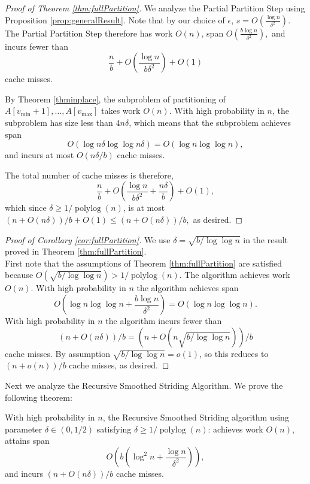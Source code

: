 \documentclass[twoside,leqno,twocolumn]{article}
\newcommand{\polylog}{\operatorname{polylog}}
\begin{document}
\begin{proof}[Proof of Theorem \ref{thm:fullPartition}]
  We analyze the Partial Partition Step using Proposition
  \ref{prop:generalResult}. Note that by our choice of $\epsilon$,
  $s=O\left(\frac{\log n}{\delta^2}\right)$.  The Partial Partition
  Step therefore has work $O(n)$, span $O\left(\frac{b\log
  n}{\delta^2}\right),$ and incurs fewer than
  $$\frac{n}{b}+O\left(\frac{\log n}{b\delta^2}\right)+O(1)$$ 
  cache misses.

  By Theorem \ref{thminplace}, the subproblem of partitioning of
  $A[v_{\text{min}} + 1], \ldots, A[v_{\text{max}}]$ takes work
  $O(n)$. With high probability in $n$, the subproblem has size
  less than $4n\delta$, which means that the subproblem achieves
  span $$O(\log n\delta \log\log n\delta) = O(\log n \log\log
  n),$$ and incurs at most $O(n \delta / b)$ cache misses.

  The total number of cache misses is therefore,
  $$\frac{n}{b}+O\left(\frac{\log n}{b\delta^2} +
  \frac{n\delta}{b}\right)+O(1),$$ which since $\delta \ge 1 /
  \polylog(n)$, is at most $(n+O(n\delta))/b + O(1) \le (n + O(n
  \delta)) / b,$ as desired.
\end{proof}

\begin{proof}[Proof of Corollary \ref{cor:fullPartition}] We use
  $\delta = \sqrt{b/\log\log n}$ in the result proved in Theorem
  \ref{thm:fullPartition}. \\
  First note that the assumptions of Theorem
  \ref{thm:fullPartition} are satisfied because
  $O(\sqrt{b/\log\log n}) > 1 / \polylog(n).$
  The algorithm achieves work $O(n)$. 
  With high probability in $n$ the algorithm achieves span 
  $$O\left(\log n \log\log n +\frac{b\log n}{\delta^2}\right) = O(\log n\log\log n).$$
  With high probability in $n$ the algorithm incurs fewer than 
  $$(n+O(n\delta))/b = (n+O(n\sqrt{b/\log\log n}))/b$$ 
  cache misses.
  By assumption $\sqrt{b/\log\log n} = o(1)$, so this reduces to 
  $(n+o(n))/b$
  cache misses, as desired.
\end{proof}



Next we analyze the Recursive Smoothed Striding Algorithm. We
prove the following theorem:
\begin{theorem}
  \label{thm:groupedPartitionAlg}
  With high probability in $n$, the Recursive Smoothed Striding
        algorithm using parameter $\delta \in(0,1/2)$ satisfying
        $\delta \ge 1 / \polylog(n)$: achieves work $O(n)$, attains span
  $$O\left(b\left(\log^2 n + \frac{\log n}{\delta^2}\right)\right),$$
  and incurs $(n+O(n \delta))/b$ cache misses. 
\end{theorem}
\end{document}
